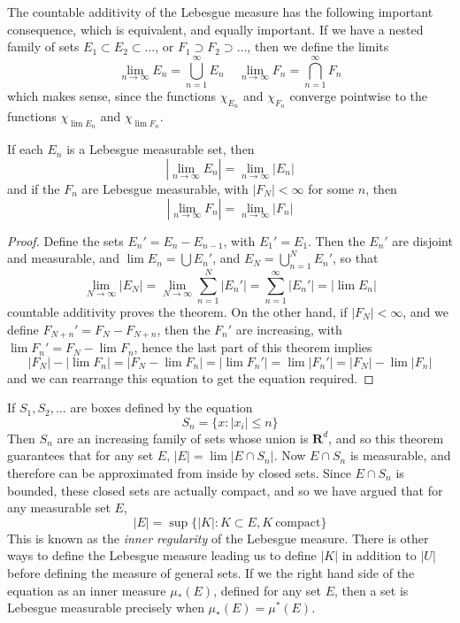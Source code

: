 The countable additivity of the Lebesgue measure has the following important consequence, which is equivalent, and equally important. If we have a nested family of sets $E_1 \subset E_2 \subset \dots$, or $F_1 \supset F_2 \supset \dots$, then we define the limits
%
\[ \lim_{n \to \infty} E_n = \bigcup_{n = 1}^\infty E_n\ \ \ \ \ \lim_{n \to \infty} F_n = \bigcap_{n = 1}^\infty F_n \]
%
which makes sense, since the functions $\chi_{E_n}$ and $\chi_{F_n}$ converge pointwise to the functions $\chi_{\lim E_n}$ and $\chi_{\lim F_n}$.

\begin{theorem}
  If each $E_n$ is a Lebesgue measurable set, then
  \[ |\lim_{n \to \infty} E_n| = \lim_{n \to \infty} |E_n| \]
  and if the $F_n$ are Lebesgue measurable, with $|F_N| < \infty$ for some $n$, then
  \[ |\lim_{n \to \infty} F_n| = \lim_{n \to \infty} |F_n| \]
\end{theorem}
\begin{proof}
  Define the sets $E_n' = E_n - E_{n-1}$, with $E_1' = E_1$. Then the $E_n'$ are disjoint and measurable, and $\lim E_n = \bigcup E_n'$, and $E_N = \bigcup_{n = 1}^N E_n'$, so that
  \[ \lim_{N \to \infty} |E_N| = \lim_{N \to \infty} \sum_{n = 1}^N |E_n'| = \sum_{n = 1}^\infty |E_n'| = |\lim E_n| \]
  countable additivity proves the theorem. On the other hand, if $|F_N| < \infty$, and we define $F_{N+n}' = F_N - F_{N+n}$, then the $F_n'$ are increasing, with $\lim F_n' = F_N - \lim F_n$, hence the last part of this theorem implies
  \[ |F_N| - |\lim F_n| = |F_N - \lim F_n| = |\lim F_n'| = \lim |F_n'| = |F_N| - \lim |F_n| \]
  and we can rearrange this equation to get the equation required.
\end{proof}

\begin{remark}
  If $S_1, S_2, \dots$ are boxes defined by the equation
  \[ S_n = \{ x: |x_i| \leq n \} \]
  Then $S_n$ are an increasing family of sets whose union is $\mathbf{R}^d$, and so this theorem guarantees that for any set $E$, $|E| = \lim |E \cap S_n|$. Now $E \cap S_n$ is measurable, and therefore can be approximated from inside by closed sets. Since $E \cap S_n$ is bounded, these closed sets are actually compact, and so we have argued that for any measurable set $E$,
  \[ |E| = \sup \{ |K| : K \subset E, K\ \text{compact} \} \]
  This is known as the {\it inner regularity} of the Lebesgue measure. There is other ways to define the Lebesgue measure leading us to define $|K|$ in addition to $|U|$ before defining the measure of general sets. If we the right hand side of the equation as an inner measure $\mu_*(E)$, defined for any set $E$, then a set is Lebesgue measurable precisely when $\mu_*(E) = \mu^*(E)$.
\end{remark}

